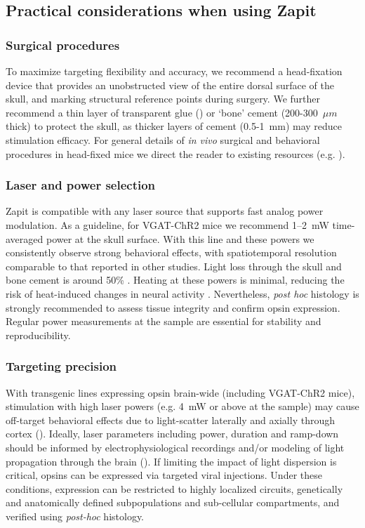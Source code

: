 \documentclass[9pt,lineno]{elife}
\begin{document}
\subsection{Practical considerations when using Zapit}
\subsubsection{Surgical procedures}
To maximize targeting flexibility and accuracy, we recommend a head-fixation device that provides an unobstructed view of the entire dorsal surface of the skull, and marking structural reference points during surgery.
We further recommend a thin layer of transparent glue (\citealp{Zatka-Haas2021SensoryDecision, Coen2023MouseDecisions}) or `bone' cement (200-300~$\mu m$ thick) to protect the skull, as thicker layers of cement (0.5-1~mm) may reduce stimulation efficacy.
For general details of \textit{in vivo} surgical and behavioral procedures in head-fixed mice we direct the reader to existing resources (e.g. \citealp{Guo2014FlowMice, Guo2014ProceduresMice} ).

\subsubsection{Laser and power selection}
Zapit is compatible with any laser source that supports fast analog power modulation.
As a guideline, for VGAT-ChR2 mice we recommend 1--2~mW time-averaged power at the skull surface.
With this line and these powers we consistently observe strong behavioral effects, with spatiotemporal resolution comparable to that reported in other studies.
Light loss through the skull and bone cement is around 50\% \citep{Guo2014FlowMice}.
Heating at these powers is minimal, reducing the risk of heat-induced changes in neural activity \citep{Stujenske2015ModelingOptogenetics}.
Nevertheless, \textit{post hoc} histology is strongly recommended to assess tissue integrity and confirm opsin expression.
Regular power measurements at the sample are essential for stability and reproducibility.


\subsubsection{Targeting precision}
With transgenic lines expressing opsin brain-wide (including VGAT-ChR2 mice), stimulation with high laser powers (e.g. 4~mW or above at the sample) may cause off-target behavioral effects due to light-scatter laterally and axially through cortex (\citealp{Li2019SpatiotemporalCircuits,Babl2019TheInterneurons}).
Ideally, laser parameters including power, duration and ramp-down should be informed by electrophysiological recordings and/or modeling of light propagation through the brain (\citealp{Yona2016RealisticApplications}).
If limiting the impact of light dispersion is critical, opsins can be expressed via targeted viral injections.
Under these conditions, expression can be restricted to highly localized circuits, genetically and anatomically defined subpopulations and sub-cellular compartments, and verified using \textit{post-hoc} histology.
\end{document}

